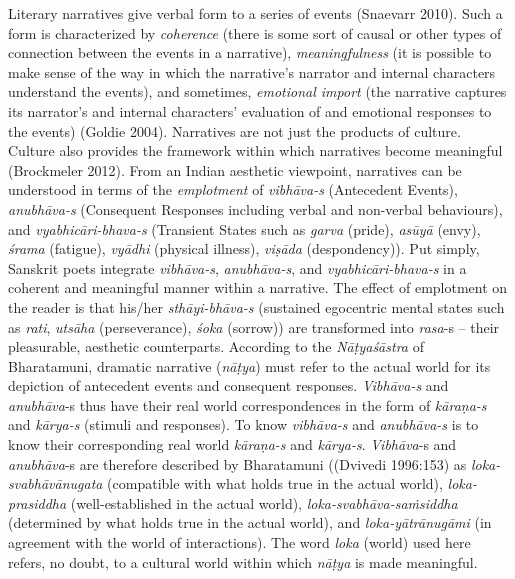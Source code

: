 Literary narratives give verbal form to a series of events (Snaevarr 2010). Such a form is characterized by \textsl{coherence} (there is some sort of causal or other types of connection between the events in a narrative), \textsl{meaningfulness }(it is possible to make sense of the way in which the narrative’s narrator and internal characters understand the events), and sometimes, \textsl{emotional import} (the narrative captures its narrator’s and internal characters’ evaluation of and emotional responses to the events) (Goldie 2004). Narratives are not just the products of culture. Culture also provides the framework within which narratives become meaningful (Brockmeler 2012). From an Indian aesthetic viewpoint, narratives can be understood in terms of the \textsl{emplotment} of \hbox{\textsl{vibhāva-s}} (Antecedent Events), \textsl{anubhāva-s} (Consequent Responses including verbal and non-verbal behaviours), and \textsl{vyabhicāri-bhava-s} (Transient States such as \textsl{garva} (pride), \textsl{asūyā} (envy), \textsl{śrama} (fatigue), \textsl{vyādhi} (physical illness), \textsl{viṣāda} (despondency)). Put simply, Sanskrit poets integrate \textsl{vibhāva-s}, \textsl{anubhāva-s}, and \textsl{vyabhicāri-bhava-s} in a coherent and meaningful manner within a narrative. The effect of emplotment on the reader is that his/her \textsl{sthāyi-bhāva-s} (sustained egocentric mental states such as \textsl{rati}, \textsl{utsāha} (perseverance), \textsl{śoka} (sorrow)) are transformed into \textsl{rasa}-s -- their pleasurable, aesthetic counterparts. According to the \textsl{Nāṭyaśāstra} of Bharatamuni, dramatic narrative (\textsl{nāṭya}) must refer to the actual world for its depiction of antecedent events and consequent responses. \textsl{Vibhāva-s} and \textsl{anubhāva}-s thus have their real world correspondences in the form of \textsl{kāraṇa-s} and \hbox{\textsl{kārya-s}} (stimuli and responses). To know \textsl{vibhāva-s} and \textsl{anubhāva-s} is to know their corresponding real world \textsl{kāraṇa-s} and \textsl{kārya-s}. \hbox{\textsl{Vibhāva}-s} and \textsl{anubhāva}-s are therefore described by Bharatamuni ((Dvivedi 1996:153) as \textsl{loka-svabhāvānugata} (compatible with what holds true in the actual world), \textsl{loka-prasiddha} (well-established in the actual world), \textsl{loka-svabhāva-saṁsiddha} (determined by what holds true in the actual world), and \textsl{loka-yātrānugāmi} (in agreement with the world of interactions). The word \textsl{loka} (world) used here refers, no doubt, to a cultural world within which \textsl{nāṭya} is made meaningful. 


